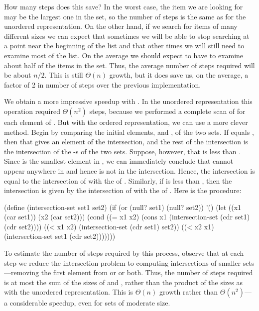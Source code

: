 \noindent
How many steps does this save?  In the worst case, the item we are looking for
may be the largest one in the set, so the number of steps is the same as for
the unordered representation.  On the other hand, if we search for items of
many different sizes we can expect that sometimes we will be able to stop
searching at a point near the beginning of the list and that other times we
will still need to examine most of the list.  On the average we should expect
to have to examine about half of the items in the set.  Thus, the average
number of steps required will be about \( n / 2 \).  This is still
\( \Theta(n) \) growth, but it does save us, on the average, a factor of 2
in number of steps over the previous implementation.

We obtain a more impressive speedup with .  In the
unordered representation this operation required \( \Theta(n^2) \) steps,
because we performed a complete scan of  for each element of
.  But with the ordered representation, we can use a more clever
method.  Begin by comparing the initial elements,  and , of
the two sets.  If  equals , then that gives an element of the
intersection, and the rest of the intersection is the intersection of the
-s of the two sets.  Suppose, however, that  is less than
.  Since  is the smallest element in , we can
immediately conclude that  cannot appear anywhere in  and
hence is not in the intersection.  Hence, the intersection is equal to the
intersection of  with the  of .  Similarly, if
 is less than , then the intersection is given by the
intersection of  with the  of .  Here is the
procedure:

\begin{codeBlock}
(define (intersection-set set1 set2)
  (if (or (null? set1) (null? set2))
      '()
      (let ((x1 (car set1)) (x2 (car set2)))
        (cond ((= x1 x2)
               (cons x1 (intersection-set (cdr set1)
                                          (cdr set2))))
              ((< x1 x2)
               (intersection-set (cdr set1) set2))
              ((< x2 x1)
               (intersection-set set1 (cdr set2)))))))
\end{codeBlock}

\noindent
To estimate the number of steps required by this process, observe that at each
step we reduce the intersection problem to computing intersections of smaller
sets---removing the first element from  or  or both.
Thus, the number of steps required is at most the sum of the sizes of
 and , rather than the product of the sizes as with the
unordered representation.  This is \( \Theta(n) \) growth rather than
\( \Theta(n^2) \)---a considerable speedup, even for sets of moderate size.

